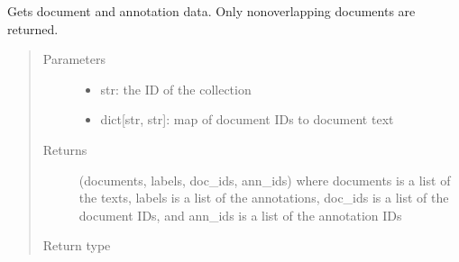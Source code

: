 \documentclass[letterpaper,10pt,english]{sphinxmanual}
\begin{document}
\begin{fulllineitems}
\begin{fulllineitems}
\label{\detokenize{autoapi/pine/pipelines/EveClient/index:pine.pipelines.EveClient.EveClient.get_docs_with_annotations}}
\sphinxAtStartPar
Gets document and annotation data.  Only non\sphinxhyphen{}overlapping documents are returned.
\begin{quote}\begin{description}
\item[{Parameters}] \leavevmode\begin{itemize}
\item {} 
\sphinxAtStartPar
{} \textendash{} str: the ID of the collection

\item {} 
\sphinxAtStartPar
{} \textendash{} dict{[}str, str{]}: map of document IDs to document text

\end{itemize}

\item[{Returns}] \leavevmode
\sphinxAtStartPar
(documents, labels, doc\_ids, ann\_ids) where documents is a list of the texts,
labels is a list of the annotations, doc\_ids is a list of the document IDs, and
ann\_ids is a list of the annotation IDs

\item[{Return type}] \leavevmode
\sphinxAtStartPar
{}


\end{description}
\end{quote}
\end{fulllineitems}
\end{fulllineitems}
\end{document}
